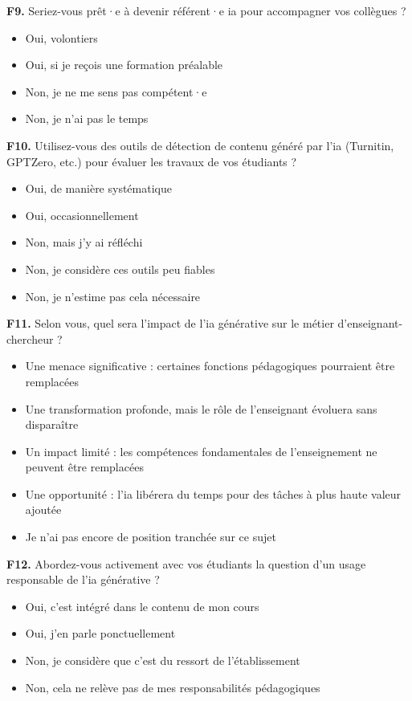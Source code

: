 \textbf{F9.} Seriez-vous prêt·e à devenir référent·e \gls{ia} pour accompagner vos collègues ?
\begin{itemize}[label=$\square$, leftmargin=1.5cm]
  \item Oui, volontiers
  \item Oui, si je reçois une formation préalable
  \item Non, je ne me sens pas compétent·e
  \item Non, je n'ai pas le temps
\end{itemize}

\textbf{F10.} Utilisez-vous des outils de détection de contenu généré par
l'\gls{ia} (Turnitin, GPTZero, etc.) pour évaluer les travaux de vos
étudiants ?
\begin{itemize}[label=$\square$, leftmargin=1.5cm]
  \item Oui, de manière systématique
  \item Oui, occasionnellement
  \item Non, mais j'y ai réfléchi
  \item Non, je considère ces outils peu fiables
  \item Non, je n'estime pas cela nécessaire
\end{itemize}
 
\textbf{F11.} Selon vous, quel sera l'impact de l'\gls{ia} générative sur
le métier d'enseignant-chercheur ?
\begin{itemize}[label=$\square$, leftmargin=1.5cm]
  \item Une menace significative : certaines fonctions pédagogiques
        pourraient être remplacées
  \item Une transformation profonde, mais le rôle de l'enseignant évoluera
        sans disparaître
  \item Un impact limité : les compétences fondamentales de l'enseignement
        ne peuvent être remplacées
  \item Une opportunité : l'\gls{ia} libérera du temps pour des tâches à
        plus haute valeur ajoutée
  \item Je n'ai pas encore de position tranchée sur ce sujet
\end{itemize}
 
\textbf{F12.} Abordez-vous activement avec vos étudiants la question d'un
usage responsable de l'\gls{ia} générative ?
\begin{itemize}[label=$\square$, leftmargin=1.5cm]
  \item Oui, c'est intégré dans le contenu de mon cours
  \item Oui, j'en parle ponctuellement
  \item Non, je considère que c'est du ressort de l'établissement
  \item Non, cela ne relève pas de mes responsabilités pédagogiques
\end{itemize}

